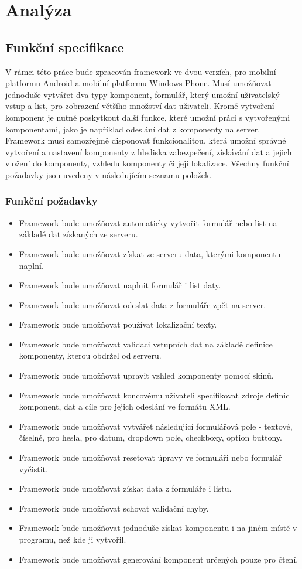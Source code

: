 \chapter{Analýza}
\section{Funkční specifikace}
V rámci této práce bude zpracován framework ve dvou verzích, pro mobilní platformu Android a mobilní platformu Windows Phone. Musí umožňovat jednoduše vytvářet dva typy komponent, formulář, který umožní uživatelský vstup a list, pro zobrazení většího množství dat uživateli. Kromě vytvoření komponent je nutné poskytkout další funkce, které umožní práci s vytvořenými komponentami, jako je například odeslání dat z komponenty na server. Framework musí samozřejmě disponovat funkcionalitou, která umožní správné vytvoření a nastavení komponenty z hlediska zabezpečení, získávání dat a jejich vložení do komponenty, vzhledu komponenty či její lokalizace. Všechny funkční požadavky jsou uvedeny v následujícím seznamu položek.
\subsection{Funkční požadavky}
\begin{itemize}
\item Framework bude umožňovat automaticky vytvořit formulář nebo list na základě dat získaných ze serveru.
\item Framework bude umožňovat získat ze serveru data, kterými komponentu naplní.
\item Framework bude umožňovat naplnit formulář i list daty.
\item Framework bude umožňovat odeslat data z formuláře zpět na server.
\item Framework bude umožňovat používat lokalizační texty.
\item Framework bude umožňovat validaci vstupních dat na základě definice komponenty, kterou obdržel od serveru.
\item Framework bude umožňovat upravit vzhled komponenty pomocí skinů.
\item Framework bude umožňovat koncovému uživateli specifikovat zdroje definic komponent, dat a cíle pro jejich odeslání ve formátu XML.
\item Framework bude umožňovat vytvářet následující formulářová pole - textové, číselné, pro hesla, pro datum, dropdown pole, checkboxy, option buttony.
\item Framework bude umožňovat resetovat úpravy ve formuláři nebo formulář vyčistit.
\item Framework bude umožňovat získat data z formuláře i listu.
\item Framework bude umožňovat schovat validační chyby.
\item Framework bude umožňovat jednoduše získat komponentu i na jiném místě v programu, než kde ji vytvořil.
\item Framework bude umožňovat generování komponent určených pouze pro čtení. 
\end{itemize}

